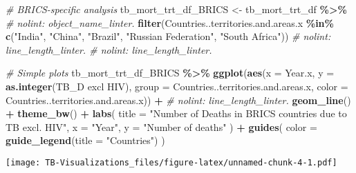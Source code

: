 \documentclass[
]{article}
\newenvironment{Shaded}{\begin{snugshade}}{\end{snugshade}}
\newcommand{\AttributeTok}[1]{\textcolor[rgb]{0.13,0.29,0.53}{#1}}
\newcommand{\CommentTok}[1]{\textcolor[rgb]{0.56,0.35,0.01}{\textit{#1}}}
\newcommand{\FunctionTok}[1]{\textcolor[rgb]{0.13,0.29,0.53}{\textbf{#1}}}
\newcommand{\NormalTok}[1]{#1}
\newcommand{\OtherTok}[1]{\textcolor[rgb]{0.56,0.35,0.01}{#1}}
\newcommand{\SpecialCharTok}[1]{\textcolor[rgb]{0.81,0.36,0.00}{\textbf{#1}}}
\newcommand{\StringTok}[1]{\textcolor[rgb]{0.31,0.60,0.02}{#1}}
\begin{document}
\begin{Shaded}
\begin{Highlighting}[]
\CommentTok{\# BRICS{-}specific analysis}
\NormalTok{tb\_mort\_trt\_df\_BRICS }\OtherTok{\textless{}{-}}\NormalTok{ tb\_mort\_trt\_df }\SpecialCharTok{\%\textgreater{}\%} \CommentTok{\# nolint: object\_name\_linter.}
  \FunctionTok{filter}\NormalTok{(}\StringTok{\textasciigrave{}}\AttributeTok{Countries..territories.and.areas.x}\StringTok{\textasciigrave{}} \SpecialCharTok{\%in\%} \FunctionTok{c}\NormalTok{(}\StringTok{"India"}\NormalTok{, }\StringTok{"China"}\NormalTok{, }\StringTok{"Brazil"}\NormalTok{, }\StringTok{"Russian Federation"}\NormalTok{, }\StringTok{"South Africa"}\NormalTok{)) }\CommentTok{\# nolint: line\_length\_linter. \# nolint: line\_length\_linter.}

\CommentTok{\# Simple plots}
\NormalTok{tb\_mort\_trt\_df\_BRICS }\SpecialCharTok{\%\textgreater{}\%}
  \FunctionTok{ggplot}\NormalTok{(}\FunctionTok{aes}\NormalTok{(}\AttributeTok{x =}\NormalTok{ Year.x, }\AttributeTok{y =} \FunctionTok{as.integer}\NormalTok{(}\StringTok{\textasciigrave{}}\AttributeTok{TB\_D excl HIV}\StringTok{\textasciigrave{}}\NormalTok{), }\AttributeTok{group =}\NormalTok{ Countries..territories.and.areas.x, }\AttributeTok{color =}\NormalTok{ Countries..territories.and.areas.x)) }\SpecialCharTok{+} \CommentTok{\# nolint: line\_length\_linter.}
  \FunctionTok{geom\_line}\NormalTok{() }\SpecialCharTok{+}
  \FunctionTok{theme\_bw}\NormalTok{() }\SpecialCharTok{+}
  \FunctionTok{labs}\NormalTok{(}
    \AttributeTok{title =} \StringTok{"Number of Deaths in BRICS countries due to TB excl. HIV"}\NormalTok{,}
    \AttributeTok{x =} \StringTok{"Year"}\NormalTok{,}
    \AttributeTok{y =} \StringTok{"Number of deaths"}
\NormalTok{  ) }\SpecialCharTok{+}
  \FunctionTok{guides}\NormalTok{(}
    \AttributeTok{color =} \FunctionTok{guide\_legend}\NormalTok{(}\AttributeTok{title =} \StringTok{"Countries"}\NormalTok{)}
\NormalTok{  )}
\end{Highlighting}
\end{Shaded}

\texttt{[image: TB-Visualizations\_files/figure-latex/unnamed-chunk-4-1.pdf]}
\end{document}
